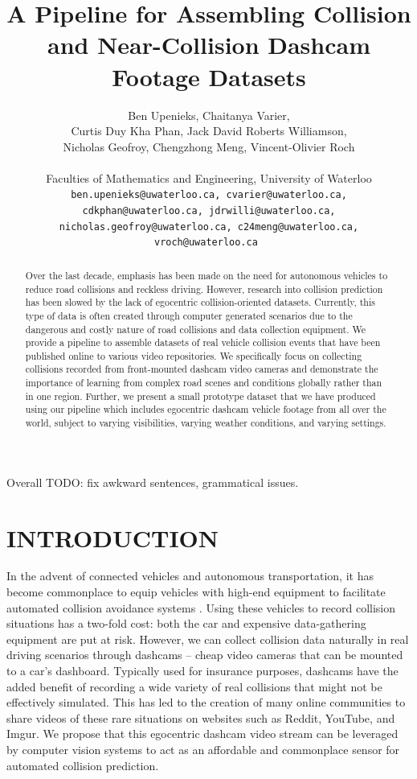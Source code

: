 \documentclass[letterpaper, 10 pt, conference]{ieeeconf}
\title{\LARGE \bf
A Pipeline for Assembling Collision and Near-Collision Dashcam Footage Datasets
}
\author{
         Ben Upenieks, Chaitanya Varier,\\
         Curtis Duy Kha Phan, Jack David Roberts Williamson,\\
         Nicholas Geofroy, Chengzhong Meng, Vincent-Olivier Roch\\
         \\
         Faculties of Mathematics and Engineering, University of Waterloo\\
         \tt\small ben.upenieks@uwaterloo.ca, cvarier@uwaterloo.ca,
         \\ \tt\small cdkphan@uwaterloo.ca, jdrwilli@uwaterloo.ca,
         \\ \tt\small nicholas.geofroy@uwaterloo.ca, c24meng@uwaterloo.ca, vroch@uwaterloo.ca
}
\newcommand{\todo}[1]{{\color{red}#1}}
\begin{document}
\maketitle
\thispagestyle{empty}
\pagestyle{empty}


\todo{Overall TODO: fix awkward sentences, grammatical issues. }
\begin{abstract}

Over the last decade, emphasis has been made on the need for autonomous vehicles to reduce road collisions and reckless driving. However, research into collision prediction has been slowed by the lack of egocentric collision-oriented datasets. Currently, this type of data is often created through computer generated scenarios \cite{Kim_Lee_Hwang_Suh_2019} due to the dangerous and costly nature of road collisions and data collection equipment. We provide a pipeline to assemble datasets of real vehicle collision events that have been published online to various video repositories. We specifically focus on collecting collisions recorded from front-mounted dashcam video cameras and demonstrate the importance of learning from complex road scenes and conditions globally rather than in one region. Further, we present a small prototype dataset that we have produced using our pipeline which includes egocentric dashcam vehicle footage from all over the world, subject to varying visibilities, varying weather conditions, and varying settings.

\end{abstract}

\section{INTRODUCTION}

In the advent of connected vehicles and autonomous transportation, it has become commonplace to equip vehicles with high-end equipment to facilitate automated collision avoidance systems \cite{Perumal2020LidarBI}.
Using these vehicles to record collision situations has a two-fold cost: both the car and expensive data-gathering equipment are put at risk.
However, we can collect collision data naturally in real driving scenarios through dashcams -- cheap video cameras that can be mounted to a car's dashboard.
Typically used for insurance purposes, dashcams have the added benefit of recording a wide variety of real collisions that might not be effectively simulated. 
This has led to the creation of many online communities to share videos of these rare situations on websites such as Reddit, YouTube, and Imgur.
We propose that this egocentric dashcam video stream can be leveraged by computer vision systems to act as an affordable and commonplace sensor for automated collision prediction. 
\end{document}

